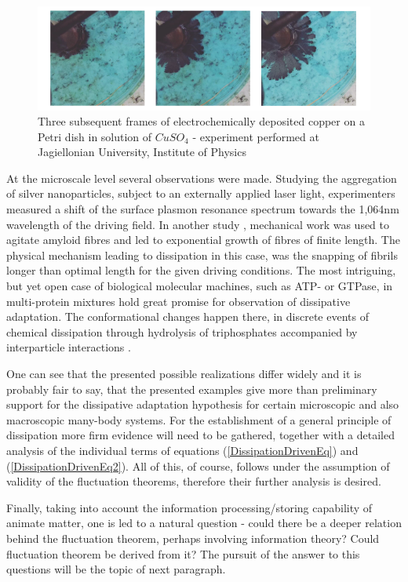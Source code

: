 \documentclass[a4paper,12pt]{article}
\begin{document}
\begin{figure}[ht!]
\centering \includegraphics[width=14cm]{Figure6} \caption{Three subsequent frames of electrochemically deposited copper on a Petri dish in solution of $CuSO_4$ - experiment performed at Jagiellonian University, Institute of Physics}
\label{Fig6} 
\end{figure}

At the microscale  level several observations were made.
Studying the aggregation of silver nanoparticles, subject to an externally applied laser light, experimenters \cite{Ito:2013fh} measured a shift of the surface plasmon resonance spectrum towards the 1,064nm wavelength of the driving field.
In another study \cite{Carnall:2010ju}, mechanical work was used to agitate amyloid fibres and led to exponential growth of fibres of finite length. The physical mechanism leading to dissipation in this case, was the snapping of fibrils longer than optimal length for the given driving conditions.
The most intriguing, but yet open case of biological molecular machines, such as ATP- or GTPase, in multi-protein mixtures hold great promise for observation of dissipative adaptation. The conformational changes happen there, in discrete events of chemical dissipation through hydrolysis of triphosphates accompanied by interparticle interactions \cite{Schaller:2010cq}.

One can see that the presented possible realizations differ widely and it is probably fair to say, that the presented examples give more than preliminary support for the dissipative adaptation hypothesis for certain microscopic and also macroscopic many-body systems. 
For the establishment of a general principle of dissipation more firm evidence will need to be gathered, together with a detailed analysis of the individual terms of equations (\ref{DissipationDrivenEq}) and (\ref{DissipationDrivenEq2}). All of this, of course, follows under the assumption of validity of the fluctuation theorems, therefore their further analysis is desired.

Finally, taking into account the information processing/storing capability of animate matter, one is led to a natural question - could there be a deeper relation behind the fluctuation theorem, perhaps involving information theory? Could fluctuation theorem be derived from it?
The pursuit of the answer to this questions will be the topic of next paragraph.
\end{document}
